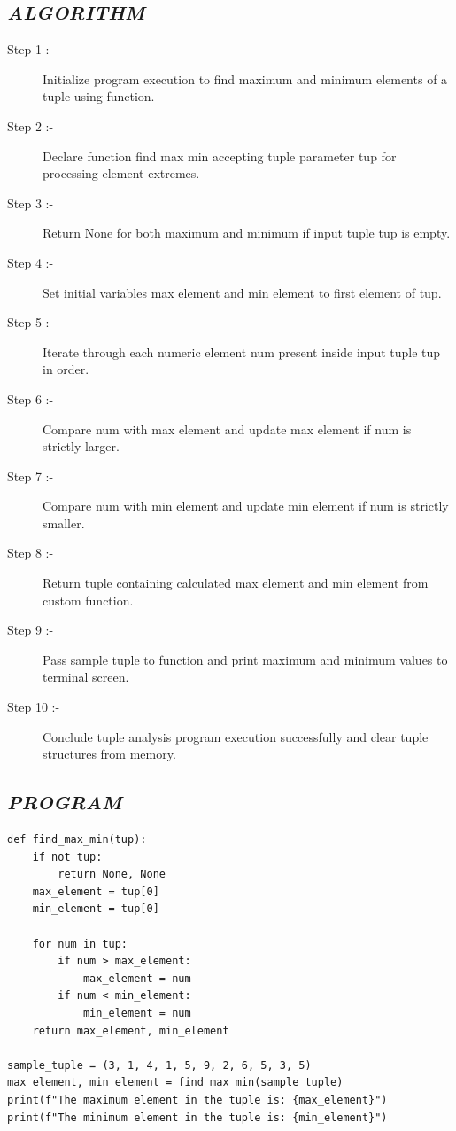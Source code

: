\documentclass[11pt,a4paper]{article}
\begin{document}
\subsection*{\textit{ALGORITHM}}
\begin{description}
  \item[Step 1 :-] Initialize program execution to find maximum and minimum elements of a tuple using function.
  \item[Step 2 :-] Declare function find max min accepting tuple parameter tup for processing element extremes.
  \item[Step 3 :-] Return None for both maximum and minimum if input tuple tup is empty.
  \item[Step 4 :-] Set initial variables max element and min element to first element of tup.
  \item[Step 5 :-] Iterate through each numeric element num present inside input tuple tup in order.
  \item[Step 6 :-] Compare num with max element and update max element if num is strictly larger.
  \item[Step 7 :-] Compare num with min element and update min element if num is strictly smaller.
  \item[Step 8 :-] Return tuple containing calculated max element and min element from custom function.
  \item[Step 9 :-] Pass sample tuple to function and print maximum and minimum values to terminal screen.
  \item[Step 10 :-] Conclude tuple analysis program execution successfully and clear tuple structures from memory.
\end{description}

\subsection*{\textit{PROGRAM}}
\begin{lstlisting}[style=pythonstyle]
def find_max_min(tup): 
    if not tup: 
        return None, None 
    max_element = tup[0] 
    min_element = tup[0] 
   
    for num in tup: 
        if num > max_element: 
            max_element = num 
        if num < min_element: 
            min_element = num 
    return max_element, min_element 
 
sample_tuple = (3, 1, 4, 1, 5, 9, 2, 6, 5, 3, 5) 
max_element, min_element = find_max_min(sample_tuple) 
print(f"The maximum element in the tuple is: {max_element}") 
print(f"The minimum element in the tuple is: {min_element}")
\end{lstlisting}
\end{document}
